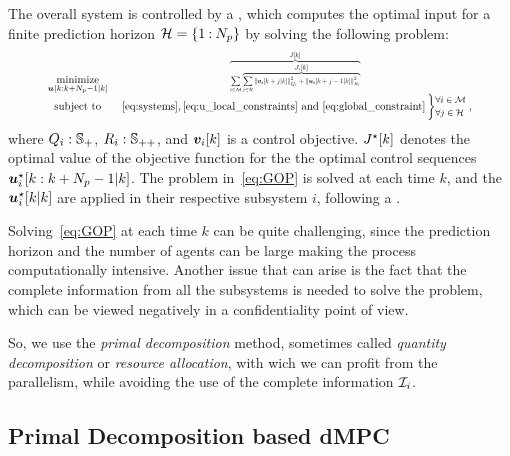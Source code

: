 \documentclass{ifacconf}  %
\begin{document}
The overall system is controlled by a \mpc{}, which
computes the optimal input for a finite prediction horizon ${\mathcal{H}=\{1\mathbin{:}N_{p}\}}$ by solving the following problem:
\begin{equation}\label{eq:GOP}
\resizebox{.88\columnwidth}{!}{$
\begin{matrix}
\underset{\useq}{\mathrm{minimize}}&\resizebox{0.35\textwidth}{!}{$\overbrace{\sum\limits_{i\in\set{M}} \overbrace{\sum_{j\in\set{H}}\norm{\mpcvec{v}[i][k+j][k]}^{2}_{Q_i}+\norm{\mpcvec{u}[i][k+j-1][k]}^{2}_{R_i}}^{\textstyle{} \obji}}^{\textstyle{} \globobj}$}\\
\mathrm{subject~ to}&~\eqref{eq:systems},\eqref{eq:u_local_constraints}\ \mathrm{and}\ \eqref{eq:global_constraint}
\left\}\small
\begin{aligned}
  &\forall i\in\set{M}\\
  &\forall j\in\set{H}
\end{aligned}\right.,

\end{matrix}
  $}
\end{equation}
where ${Q_{i}:\mathbb{S}_{+}}$, ${R_{i}:\mathbb{S}_{++}}$, and $\vik$ is a control objective.
$\optglobobj$ denotes the optimal value of the objective function for the the optimal control sequences ${\optuiseq}$.
The problem in~\eqref{eq:GOP} is solved at each time $k$, and the ${\optuikk}$ are applied in their respective subsystem $i$, following a \rhs{}.

Solving~\eqref{eq:GOP} at each time $k$ can be quite challenging, since the prediction horizon and the number of agents can be large making the process computationally intensive. Another issue that can arise is the fact that the complete information  from all the subsystems is needed to solve the problem,
which can be viewed negatively in a confidentiality point of view.

So, we use the \emph{primal decomposition} method, sometimes called \emph{quantity decomposition} or \emph{resource allocation}, with wich we can profit from the parallelism, while avoiding the use of the complete information $\mathcal{I}_{i}$.

\subsection{Primal Decomposition based dMPC}\label{ssec:dMPC}
\end{document}
